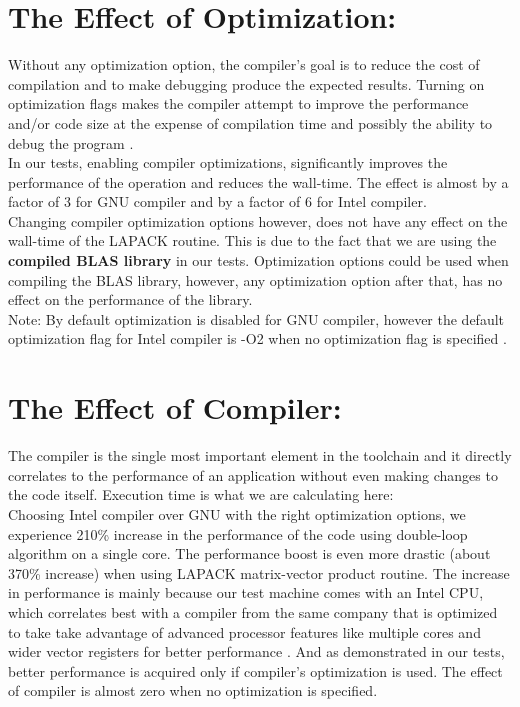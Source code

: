 \documentclass[a4paper,11pt]{article}
\begin{document}
\section{\large The Effect of Optimization:}
Without any optimization option, the compiler's goal is to reduce the cost of compilation and to make debugging produce the expected results. Turning on optimization flags makes the compiler attempt to improve the performance and/or code size at the expense of compilation time and possibly the ability to debug the program \cite{gnuoptimization}.\\
In our tests, enabling compiler optimizations, significantly improves the performance of the operation and reduces the wall-time. The effect is almost by a factor of 3 for GNU compiler and by a factor of 6 for Intel compiler.\\
Changing compiler optimization options however, does not have any effect on the wall-time of the LAPACK routine. This is due to the fact that we are using the \textbf{compiled BLAS library} in our tests. Optimization options could be used when compiling the BLAS library, however, any optimization option after that, has no effect on the performance of the library. \\
Note: By default optimization is disabled for GNU compiler, however the default optimization flag for Intel compiler is -O2 when no optimization flag is specified \cite{inteloptimization}.

\section{\large The Effect of Compiler:}
The compiler is the single most important element in the toolchain and it directly correlates to the performance of an application without even making changes to the code itself. Execution time is what we are calculating here:\\Choosing Intel compiler over GNU with the right optimization options, we experience 210\% increase in the performance of the code using double-loop algorithm on a single core. The performance boost is even more drastic (about 370\% increase) when using LAPACK matrix-vector product routine. The increase in performance is mainly because our test machine comes with an Intel CPU, which correlates best with a compiler from the same company that is optimized to take take advantage of advanced processor features like multiple cores and wider vector registers for better performance \cite{intelcompiler}. And as demonstrated in our tests, better performance is acquired only if compiler's optimization is used. The effect of compiler is almost zero when no optimization is specified.
\end{document}
